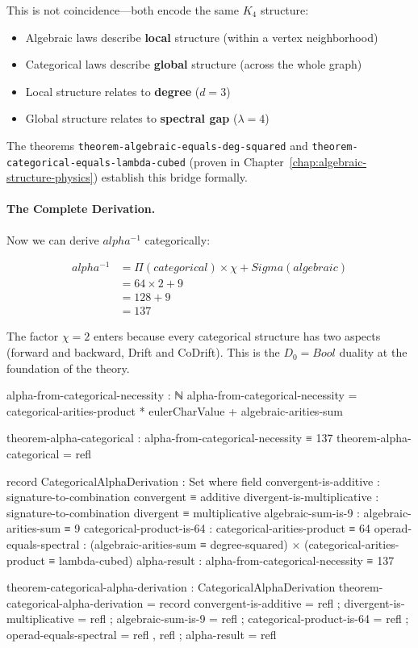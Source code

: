 \documentclass[11pt,a4paper]{book}
\def\Sigma{Sigma}%
\def\alpha{alpha}%
\def\text#1{#1}%
\begin{document}
This is not coincidence---both encode the same $K_4$ structure:
\begin{itemize}
\item Algebraic laws describe \textbf{local} structure (within a vertex neighborhood)
\item Categorical laws describe \textbf{global} structure (across the whole graph)
\item Local structure relates to \textbf{degree} ($d = 3$)
\item Global structure relates to \textbf{spectral gap} ($\lambda = 4$)
\end{itemize}

The theorems \verb|theorem-algebraic-equals-deg-squared| and 
\verb|theorem-categorical-equals-lambda-cubed| (proven in 
Chapter~\ref{chap:algebraic-structure-physics}) establish this bridge formally.

\paragraph{The Complete Derivation.}

Now we can derive $\alpha^{-1}$ categorically:

\begin{align*}
\alpha^{-1} &= \Pi(\text{categorical}) \times \chi + \Sigma(\text{algebraic}) \\
            &= 64 \times 2 + 9 \\
            &= 128 + 9 \\
            &= 137
\end{align*}

The factor $\chi = 2$ enters because every categorical structure has 
two aspects (forward and backward, Drift and CoDrift). This is the 
$D_0 = \text{Bool}$ duality at the foundation of the theory.

\begin{code}
alpha-from-categorical-necessity : ℕ
alpha-from-categorical-necessity = categorical-arities-product * eulerCharValue + algebraic-arities-sum

theorem-alpha-categorical : alpha-from-categorical-necessity ≡ 137
theorem-alpha-categorical = refl

record CategoricalAlphaDerivation : Set where
  field
    convergent-is-additive    : signature-to-combination convergent ≡ additive
    divergent-is-multiplicative : signature-to-combination divergent ≡ multiplicative
    algebraic-sum-is-9        : algebraic-arities-sum ≡ 9
    categorical-product-is-64 : categorical-arities-product ≡ 64
    operad-equals-spectral    : (algebraic-arities-sum ≡ degree-squared) × 
                                (categorical-arities-product ≡ lambda-cubed)
    alpha-result              : alpha-from-categorical-necessity ≡ 137

theorem-categorical-alpha-derivation : CategoricalAlphaDerivation
theorem-categorical-alpha-derivation = record
  { convergent-is-additive      = refl
  ; divergent-is-multiplicative = refl
  ; algebraic-sum-is-9          = refl
  ; categorical-product-is-64   = refl
  ; operad-equals-spectral      = refl , refl
  ; alpha-result                = refl
  }
\end{code}
\end{document}
